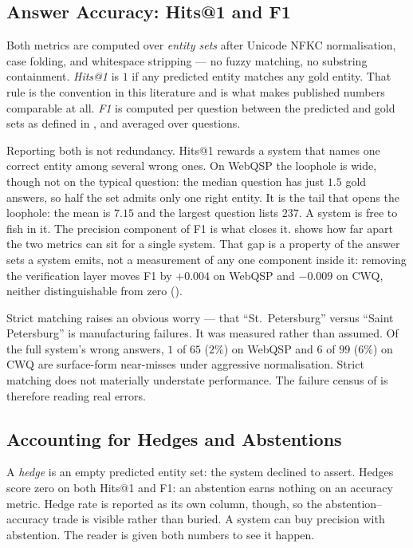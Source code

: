 \subsection{Answer Accuracy: Hits@1 and F1}

Both metrics are computed over \emph{entity sets} after Unicode
NFKC normalisation, case folding, and
whitespace stripping --- no fuzzy matching, no substring containment.
\emph{Hits@1} is $1$ if any predicted entity matches any gold entity. That rule
is the convention in this literature and is what makes published numbers
comparable at all. \emph{F1} is computed per question between the predicted and
gold sets as defined in , and averaged over questions.

Reporting both is not redundancy. Hits@1 rewards a system that names one correct
entity among several wrong ones. On WebQSP the loophole is wide, though not on
the typical question: the median question has just $1.5$ gold answers, so half
the set admits only one right entity. It is the tail that opens the loophole:
the mean is $7.15$ and the largest question lists $237$. A system is free
to fish in it. The precision component of F1 is what closes it.
 shows how far apart the two metrics can sit for a
single system. That gap is a property of the answer sets a system emits, not a
measurement of any one component inside it: removing the verification layer
moves F1 by $+0.004$ on WebQSP and $-0.009$ on CWQ, neither distinguishable from
zero ().

Strict matching raises an obvious worry --- that ``St.~Petersburg'' versus
``Saint Petersburg'' is manufacturing failures. It was measured rather than
assumed. Of the full system's wrong answers, $1$ of $65$ ($2\%$) on WebQSP and
$6$ of $99$ ($6\%$) on CWQ are surface-form near-misses under aggressive
normalisation. Strict matching does not materially understate performance. The
failure census of  is therefore reading real errors.

\subsection{Accounting for Hedges and Abstentions}\label{sec:hedge-accounting}

A \emph{hedge} is an empty predicted entity set: the system
declined to assert. Hedges score zero on both Hits@1 and F1: an abstention
earns nothing on an accuracy metric. Hedge rate is reported as its own
column, though, so the abstention--accuracy trade is visible rather than
buried. A system can buy precision with abstention. The reader is given both
numbers to see it happen.

